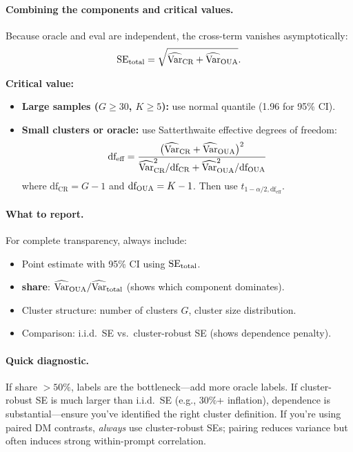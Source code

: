 \paragraph{Combining the components and critical values.}

Because oracle and eval are independent, the cross-term vanishes asymptotically:
\begin{equation}
\operatorname{SE}_{\text{total}} = \sqrt{\widehat{\operatorname{Var}}_{\text{CR}} + \widehat{\operatorname{Var}}_{\text{OUA}}}.
\end{equation}

\textbf{Critical value:}
\begin{itemize}
\item \textbf{Large samples ($G \ge 30$, $K \ge 5$):} use normal quantile (1.96 for 95\% CI).
\item \textbf{Small clusters or oracle:} use Satterthwaite effective degrees of freedom:
\begin{equation}
\text{df}_{\text{eff}} = \frac{\bigl(\widehat{\operatorname{Var}}_{\text{CR}} + \widehat{\operatorname{Var}}_{\text{OUA}}\bigr)^2}
{\widehat{\operatorname{Var}}_{\text{CR}}^2/\text{df}_{\text{CR}} + \widehat{\operatorname{Var}}_{\text{OUA}}^2/\text{df}_{\text{OUA}}}
\end{equation}
where $\text{df}_{\text{CR}} = G-1$ and $\text{df}_{\text{OUA}} = K-1$. Then use $t_{1-\alpha/2, \text{df}_{\text{eff}}}$.
\end{itemize}

\paragraph{What to report.} For complete transparency, always include:
\begin{itemize}
\item Point estimate with 95\% CI using $\operatorname{SE}_{\text{total}}$.
\item \textbf{\oua{} share}: $\widehat{\operatorname{Var}}_{\text{OUA}}/\widehat{\operatorname{Var}}_{\text{total}}$ (shows which component dominates).
\item Cluster structure: number of clusters $G$, cluster size distribution.
\item Comparison: i.i.d.\ SE vs.\ cluster-robust SE (shows dependence penalty).
\end{itemize}

\paragraph{Quick diagnostic.} If \oua{} share $> 50\%$, labels are the bottleneck---add more oracle labels. If cluster-robust SE is much larger than i.i.d.\ SE (e.g., 30\%+ inflation), dependence is substantial---ensure you've identified the right cluster definition. If you're using paired DM contrasts, \emph{always} use cluster-robust SEs; pairing reduces variance but often induces strong within-prompt correlation.

